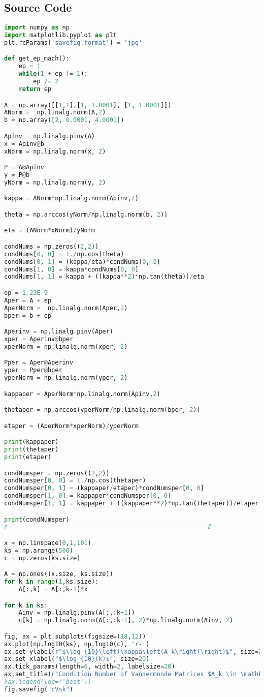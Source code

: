 \documentclass{article}
\begin{document}
\subsection*{Source Code}
\begin{lstlisting}[language=python]
import numpy as np
import matplotlib.pyplot as plt
plt.rcParams['savefig.format'] = 'jpg'

def get_ep_mach():
	ep = 1
	while(1 + ep != 1):
		ep /= 2
	return ep

A = np.array([[1,1],[1, 1.0001], [1, 1.0001]])
ANorm =  np.linalg.norm(A,2)
b = np.array([2, 0.0001, 4.0001])

Apinv = np.linalg.pinv(A)
x = Apinv@b
xNorm = np.linalg.norm(x, 2)

P = A@Apinv
y = P@b
yNorm = np.linalg.norm(y, 2)

kappa = ANorm*np.linalg.norm(Apinv,2)

theta = np.arccos(yNorm/np.linalg.norm(b, 2))

eta = (ANorm*xNorm)/yNorm

condNums = np.zeros((2,2))
condNums[0, 0] = 1./np.cos(theta)
condNums[0, 1] = (kappa/eta)*condNums[0, 0]
condNums[1, 0] = kappa*condNums[0, 0]
condNums[1, 1] = kappa + ((kappa**2)*np.tan(theta))/eta

ep = 1.23E-9
Aper = A + ep
AperNorm =  np.linalg.norm(Aper,2)
bper = b + ep

Aperinv = np.linalg.pinv(Aper)
xper = Aperinv@bper
xperNorm = np.linalg.norm(xper, 2)

Pper = Aper@Aperinv
yper = Pper@bper
yperNorm = np.linalg.norm(yper, 2)

kappaper = AperNorm*np.linalg.norm(Apinv,2)

thetaper = np.arccos(yperNorm/np.linalg.norm(bper, 2))

etaper = (AperNorm*xperNorm)/yperNorm

print(kappaper)
print(thetaper)
print(etaper)

condNumsper = np.zeros((2,2))
condNumsper[0, 0] = 1./np.cos(thetaper)
condNumsper[0, 1] = (kappaper/etaper)*condNumsper[0, 0]
condNumsper[1, 0] = kappaper*condNumsper[0, 0]
condNumsper[1, 1] = kappaper + ((kappaper**2)*np.tan(thetaper))/etaper

print(condNumsper)
#-------------------------------------------------------#

x = np.linspace(0,1,101)
ks = np.arange(500)
c = np.zeros(ks.size)

A = np.ones((x.size, ks.size))
for k in range(1,ks.size):
	A[:,k] = A[:,k-1]*x

for k in ks:
	Ainv = np.linalg.pinv(A[:,:k+1])
	c[k] = np.linalg.norm(A[:,:k+1], 2)*np.linalg.norm(Ainv, 2)

fig, ax = plt.subplots(figsize=(18,12))
ax.plot(np.log10(ks), np.log10(c), 'r-')
ax.set_ylabel(r"$\log_{10}\left(\kappa\left(A_k\right)\right)$", size=20)
ax.set_xlabel("$\log_{10}(k)$", size=20)
ax.tick_params(length=6, width=2, labelsize=20)
ax.set_title(r"Condition Number of Vandermonde Matrices $A_k \in \mathbb{R}^{101\times(k+1)}$", size = 20)
#ax.legend(loc=('best'))
fig.savefig("cVsk")

\end{lstlisting}
\noindent\makebox[\linewidth]{\rule{\paperwidth}{0.4pt}}
	
\end{document}
